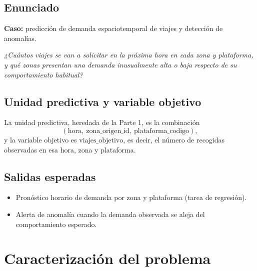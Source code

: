 \documentclass[11pt,a4paper]{article}
\begin{document}
\subsection{Enunciado}
\textbf{Caso:} predicción de demanda espaciotemporal de viajes y detección de anomalías.

\emph{¿Cuántos viajes se van a solicitar en la próxima hora en cada zona y plataforma, y qué
zonas presentan una demanda inusualmente alta o baja respecto de su comportamiento
habitual?}

\subsection{Unidad predictiva y variable objetivo}
La unidad predictiva, heredada de la Parte 1, es la combinación
\[
(\text{hora},\ \text{zona\_origen\_id},\ \text{plataforma\_codigo}),
\]
y la variable objetivo es $\text{viajes\_objetivo}$, es decir, el número de recogidas observadas
en esa hora, zona y plataforma.

\subsection{Salidas esperadas}
\begin{itemize}
  \item Pronóstico horario de demanda por zona y plataforma (tarea de regresión).
  \item Alerta de anomalía cuando la demanda observada se aleja del comportamiento esperado.
\end{itemize}

\section{Caracterización del problema}
\end{document}
